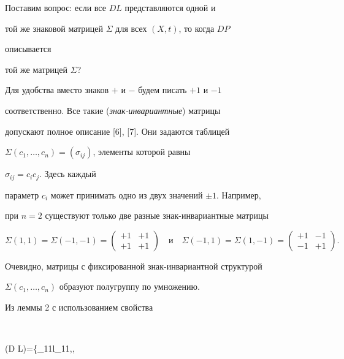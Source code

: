  


Поставим вопрос: если все $D L$ представляются одной и 


той же знаковой матрицей $\Sigma$ для всех $(X,t)$, то когда $D P$ 


описывается 


той же матрицей $\Sigma$? 


 


Для удобства вместо знаков $+$ и $-$ будем писать $+1$ и $-1$ 


соответственно. Все такие ({\it знак-инвариантные\/}) матрицы 


допускают полное описание [6], [7]. Они задаются таблицей 


$\Sigma(c_1,\dotsc,c_n)=(\sigma_{i j})$, элементы которой равны 


$\sigma_{i j}=c_i c_j$. Здесь каждый 


параметр $c_i$ может принимать одно из двух значений $\pm1$. Например, 


при $n=2$ существуют только две разные знак-инвариантные матрицы 


$$ 


\Sigma(1,1)=\Sigma(-1,-1)= 


\begin{pmatrix} 


+1 & +1 \\ +1 & +1 


\end{pmatrix} 


\quad\text{и}\quad 


\Sigma(-1,1)=\Sigma(1,-1)= 


\begin{pmatrix} 


+1 & -1 \\ -1 & +1 


\end{pmatrix} 


. 


$$ 


Очевидно, матрицы с фиксированной знак-инвариантной структурой 


$\Sigma(c_1,\dotsc,c_n)$ образуют полугруппу по умножению. 


 


Из леммы 2 с использованием свойства 


$$ 


\rho(D L)=\min\{\sigma_{11}l_{11},\dotsc, 


